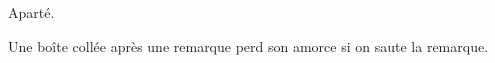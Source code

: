 \begin{remark}
  Aparté.
\end{remark} %

\begin{theorem}
  Une boîte collée après une remarque perd son amorce si on saute la remarque.
\end{theorem}
